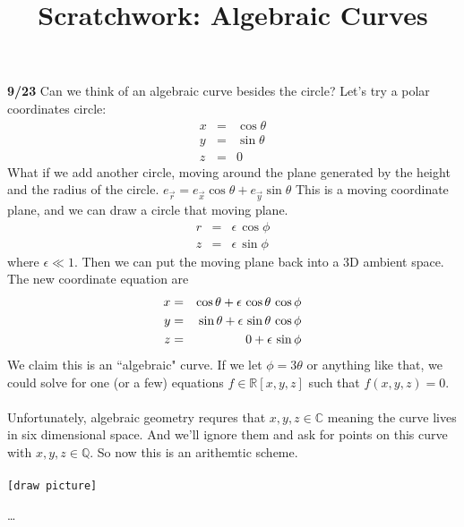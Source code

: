 \documentclass[12pt]{article}
\title{Scratchwork: Algebraic Curves}
\date{}
\begin{document}
\sffamily

\maketitle

\noindent \textbf{9/23} Can we think of an algebraic curve besides the circle?  Let's try a polar coordinates circle:
\begin{eqnarray*}
x &=& \cos \theta \\
y &=& \sin \theta \\
z &=& 0
\end{eqnarray*} 
What if we add another circle, moving around the plane generated by the height and the radius of the circle. $e_{\vec{r}} = e_{\vec{x}} \cos \theta + e_{\vec{y}} \sin \theta $  This is a moving coordinate plane, and we can draw a circle that moving plane.
\begin{eqnarray*}
r &=& \epsilon \, \cos \phi \\
z &=& \epsilon \, \sin \phi
\end{eqnarray*} 
where $\epsilon \ll 1$. Then we can put the moving plane back into a 3D ambient space.  The new coordinate equation are
\begin{eqnarray*}
x &=& \cos \theta + \epsilon \, \cos \theta \, \cos \phi \\ 
y &=& \sin \theta + \epsilon \, \sin \theta \, \cos \phi \\ 
z &=& \hspace{0.25in}0 + \epsilon \, \sin \phi  
\end{eqnarray*}
We claim this is an ``algebraic" curve.  If we let $\phi = 3 \theta$ or anything like that, we could solve for one (or a few) equations $f \in \mathbb{R}[x,y,z]$ such that $f(x,y,z) = 0$. \\ \\
Unfortunately, algebraic geometry requres that $x,y,z \in \mathbb{C}$ meaning the curve lives in six dimensional space.  And we'll ignore them and ask for points on this curve with $x,y,z \in \mathbb{Q}$. So now this is an arithemtic scheme. \\ \\
\texttt{[draw picture]} \begin{tikzpicture} \end{tikzpicture}

\begin{thebibliography}{}

\item \dots

\end{thebibliography}
\end{document}
